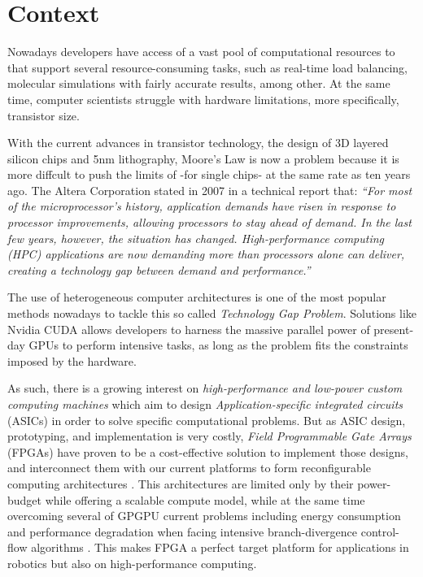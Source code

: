 \section{Context}
Nowadays developers have access of a vast pool of computational resources to
that support several resource-consuming tasks, such as real-time load balancing, molecular
simulations with fairly accurate results, among other. At the same time, computer
scientists struggle with hardware limitations, more specifically, transistor size.

With the current advances in transistor technology, the design of 3D layered silicon 
chips and 5nm lithography, Moore's Law is now a problem because it is more diffcult to push the 
limits of -for single chips- at the same rate as ten years ago\cite{7478302,EETIMES1}.
The Altera Corporation stated in 2007 in a technical report that: \emph{``For most of 
the microprocessor's history, application demands have risen in response to 
processor improvements, allowing processors to stay ahead of demand. In the last 
few years, however, the situation has changed. High-performance computing (HPC) 
applications are now demanding more than processors alone can deliver, creating a 
technology gap between demand and performance.''}\cite{ALTERA_Accel_fpga}

The use of heterogeneous computer architectures is one of the most popular methods
nowadays to tackle this so called \emph{Technology Gap Problem}. Solutions like Nvidia CUDA
\cite{NVIDIA_volta} allows developers to harness the massive parallel power of present-day
GPUs to perform intensive tasks, as long as the problem fits the constraints imposed
by the hardware. 

As such, there is a growing interest on \emph{high-performance and low-power custom computing 
machines} which aim to design \emph{Application-specific integrated circuits} (ASICs) in order 
to solve  specific computational problems. But as ASIC design, prototyping, and implementation is
very costly, \emph{Field Programmable Gate Arrays} (FPGAs) have proven to be a cost-effective 
solution to implement those designs, and interconnect them with our current platforms to form 
reconfigurable computing architectures \cite{ReconfigurableComputing, 6589302,
Compton00anintroduction}. This architectures are limited only by their power-budget while offering a scalable
compute model, while at the same time overcoming several of GPGPU current problems including energy consumption
and performance degradation when facing intensive branch-divergence control-flow algorithms 
\cite{6376229}. This makes FPGA a perfect target platform for applications in robotics but
also on high-performance computing. 


